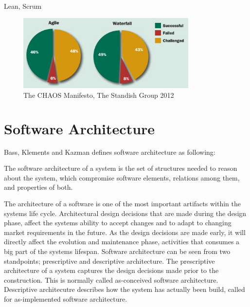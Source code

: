 Lean, Scrum

\begin{figure}
	\centering
	\includegraphics[width=0.8\textwidth]{images/Agile-Waterfall-Success-Failure-Rates.jpg}
	\caption{The CHAOS Manifesto, The Standish Group 2012}
	\label{fig:agileWaterfallSuccessFailureRates}
\end{figure}




\section{Software Architecture}
Bass, Klements and Kazman\cite{Bass:2012:SAP:2392670} defines software architecture as following: 

\begin{displayquote}
The software architecture of a system is the set of structures needed to reason about the system, which compromise software elements, relations among them, and properties of both.
\end{displayquote}

The architecture of a software is one of the most important artifacts within the systems life cycle\cite{Bass:2012:SAP:2392670,knodel2006static}. Architectural design decisions that are made during the design phase, affect the systems ability to accept changes and to adapt to changing market requirements in the future. As the design decisions are made early, it will directly affect the evolution and maintenance phase\cite{Pressman:2009:SEP:1593949}, activities that consumes a big part of the systems lifespan\cite{Vliet:2008:SEP:1481475}. Software architecture can be seen from two standpoints; prescriptive and descriptive architecture. The prescriptive architecture of a system captures the design decisions made prior to the construction. This is normally called as-conceived software architecture. Descriptive architecutre describes how the system has actually been build, called for as-implemented software architecture. 

